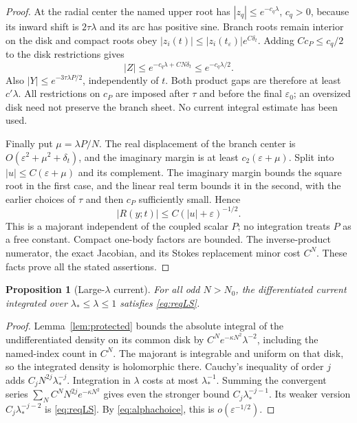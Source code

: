\documentclass[11pt]{article}
\numberwithin{equation}{section}
\newtheorem{proposition}[theorem]{Proposition}
\theoremstyle{definition}
\newcommand{\eps}{\varepsilon}
\begin{document}
\begin{proof}
At the radial center the named upper root has
\(|z_q|\le e^{-c_q\lambda}\), \(c_q>0\), because its inward
shift is \(2\tau\lambda\) and its arc has positive sine.
Branch roots remain interior on the disk and compact roots obey
\(|z_i(t)|\le |z_i(t_\eps)|e^{C\delta_t}\).
Adding \(Cc_P\le c_q/2\) to the disk restrictions gives
\[
 |Z|\le e^{-c_q\lambda+CN\delta_t}\le e^{-c_q\lambda/2}.
\]
Also \(|Y|\le e^{-3\tau\lambda P/2}\), independently of \(t\).
Both product gaps are therefore at least \(c'\lambda\).
All restrictions on \(c_P\) are imposed after \(\tau\) and
before the final \(\eps_0\); an oversized disk need not preserve
the branch sheet. No current integral estimate has been used.

Finally put \(\mu=\lambda P/N\). The real displacement of the
branch center is \(O(\eps^2+\mu^2+\delta_t)\), and the imaginary
margin is at least \(c_2(\eps+\mu)\).
Split into \(|u|\le C(\eps+\mu)\) and its complement.
The imaginary margin bounds the square root in the first
case, and the linear real term bounds it in the second, with
the earlier choices of \(\tau\) and then \(c_P\) sufficiently small. Hence
\[
 |R(y;t)|\le C(|u|+\eps)^{-1/2}.
\]
This is a majorant independent of the coupled scalar \(P\);
no integration treats \(P\) as a free constant. Compact
one-body factors are bounded. The inverse-product numerator,
the exact Jacobian, and its Stokes replacement minor cost
\(C^N\). These facts prove all the stated assertions.
\end{proof}

\begin{proposition}[Large-\(\lambda\) current]\label{prop:largeS}
For all odd $N>N_0$, the differentiated current integrated over
\(\lambda_*\le\lambda\le1\) satisfies \eqref{eq:reqLS}.
\end{proposition}
\begin{proof}
Lemma~\ref{lem:protected} bounds the absolute integral of
the undifferentiated density on its common disk by
\(C^Ne^{-\kappa N^2}\lambda^{-2}\), including the named-index
count in \(C^N\). The majorant is integrable and uniform on
that disk, so the integrated density is holomorphic there.
Cauchy's inequality of order \(j\) adds
\(C_jN^{2j}\lambda_*^{-j}\). Integration in \(\lambda\) costs
at most \(\lambda_*^{-1}\). Summing the convergent series
\(\sum_N C^NN^{2j}e^{-\kappa N^2}\) gives even the stronger
bound \(C_j\lambda_*^{-j-1}\). Its weaker version
\(C_j\lambda_*^{-j-2}\) is \eqref{eq:reqLS}.
By \eqref{eq:alphachoice}, this is \(o(\eps^{-1/2})\).
\end{proof}
\end{document}
